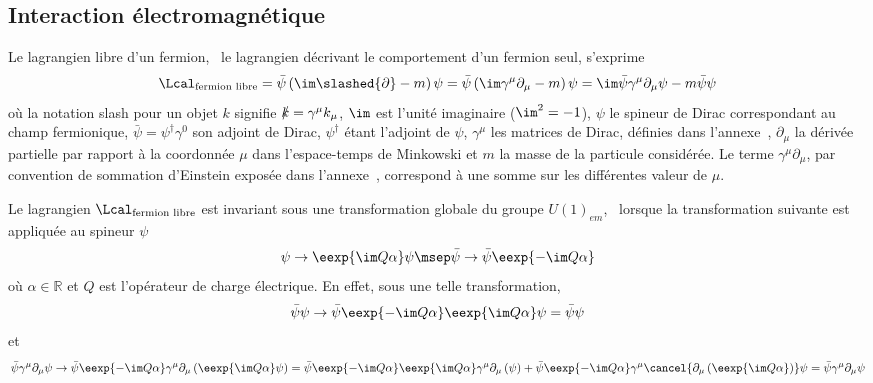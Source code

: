 \subsection{Interaction électromagnétique}\label{chapter-MS-MSSM-section-formalisme-subsec-QED}
Le lagrangien libre d'un fermion, \ie\ le lagrangien décrivant le comportement d'un fermion seul, s'exprime
\begin{equation}
\Lcal_{\text{fermion libre}}
= \bar{\psi} \left( \im\slashed{\partial} - m \right) \psi
= \bar{\psi} \left( \im \gamma^\mu\partial_\mu - m \right) \psi
= \im \bar{\psi} \gamma^\mu\partial_\mu \psi - m \bar{\psi}\psi
\label{eq-lagrangien_fermion_libre_partial}
\end{equation}
où la notation \og slash \fg{} pour un objet $k$ signifie $\slashed{k} = \gamma^\mu k_\mu$, $\im$ est l'unité imaginaire ($\im^2=-1$), $\psi$ le spineur de Dirac correspondant au champ fermionique, $\bar{\psi}=\psi^\dagger\gamma^0$ son adjoint de Dirac, $\psi^\dagger$ étant l'adjoint de $\psi$, $\gamma^\mu$ les matrices de Dirac, définies dans l'annexe~, $\partial_\mu$ la dérivée partielle par rapport à la coordonnée $\mu$ dans l'espace-temps de Minkowski et $m$ la masse de la particule considérée.
Le terme $\gamma^\mu \partial_\mu$, par convention de sommation d'Einstein exposée dans l'annexe~, correspond à une somme sur les différentes valeur de $\mu$.
\par Le lagrangien $\Lcal_{\text{fermion libre}}$ est invariant sous une transformation globale du groupe $U(1)_{em}$, \ie\ lorsque la transformation suivante est appliquée au spineur $\psi$
\begin{equation}
\psi \to \eexp{\im Q\alpha}\psi
\msep
\bar{\psi} \to \bar{\psi}\eexp{-\im Q\alpha}
\end{equation}
où $\alpha\in\mathbb{R}$ et $Q$ est l'opérateur de charge électrique.
En effet, sous une telle transformation,
\begin{equation}
\bar{\psi}\psi \to \bar{\psi}\eexp{-\im Q\alpha}\eexp{\im Q\alpha}\psi = \bar{\psi}\psi
\label{eq-chapter-MS-MSSM-section-formalisme-subsec-QED-tr_jauge-spineur}
\end{equation}
et
\begin{equation}
\bar{\psi} \gamma^\mu\partial_\mu \psi
\to
\bar{\psi}\eexp{-\im Q\alpha}
\gamma^\mu\partial_\mu
\left(\eexp{\im Q\alpha}\psi\right)
=
\bar{\psi}\eexp{-\im Q\alpha}
\eexp{\im Q\alpha}
\gamma^\mu\partial_\mu
\left(\psi\vphantom{\psi\eexp{\im Q\alpha}}\right)
+
\bar{\psi}\eexp{-\im Q\alpha}
\gamma^\mu
\cancel{\partial_\mu \left(\eexp{\im Q\alpha}\vphantom{\psi\eexp{\im Q\alpha}}\right)}\psi
= \bar{\psi} \gamma^\mu\partial_\mu \psi
\end{equation}
